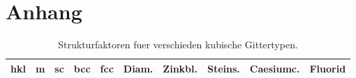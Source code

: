 \newpage
\section{Anhang}\label{sec:Anhang}%
\vspace{-5cm}
\begin{table}
		\centering
		\caption{Strukturfaktoren fuer verschieden kubische Gittertypen.}
		\label{tab:struct}
		\begin{tabular}{c c c c c c c c c c}
				\toprule
				hkl & m & sc & bcc & fcc & Diam. & Zinkbl. & Steins. & Caesiumc. & Fluorid \\ 
				\midrule
					
				\bottomrule
		\end{tabular}
\end{table}
\vspace{-5cm}
